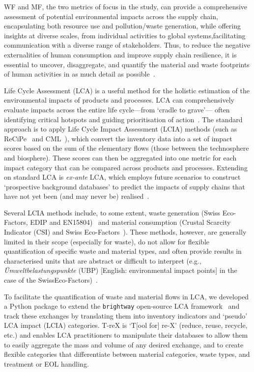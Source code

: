 \documentclass[a4paper,fleqn]{cas-dc}
\begin{document}
WF and MF, the two metrics of focus in the study, can provide a comprehensive assessment of potential environmental impacts across the supply chain, encapsulating both resource use and pollution/waste generation, while offering insights at diverse scales, from individual activities to global  systems,facilitating communication with a diverse range of stakeholders. Thus, to reduce the negative externalities of human consumption and improve supply chain resilience, it is essential to uncover, disaggregate, and quantify the material and waste footprints of human activities in as much detail as  possible~\citep{bisinella2024wastelca,towa2020wastefootprint,berger2020mineralsinlca,sonderegger2020mineralsinlca}.

Life Cycle Assessment (LCA) is a useful method for the holistic estimation of the environmental impacts of products and processes. LCA can comprehensively evaluate impacts across the entire life cycle---from `cradle to grave'--- often identifying critical hotspots and guiding prioritisation of  action~\citep{guinee2011lca}. The standard approach is to apply Life Cycle Impact Assessment (LCIA) methods (such as ReCiPe~\citep{huijbregts2016recipe} and CML~\citep{guinee2002cml}), which convert the inventory data into a set of impact scores based on the sum of the elementary flows (those between the technosphere and biosphere). These scores can then be aggregated into  one metric for each impact  category that can be compared across products and processes. Extending on standard LCA is \textit{ex-ante} LCA, which employs future scenarios to construct `prospective background databases' to predict the impacts of supply chains that have not yet been (and may never be) realised~\citep{cucurachi2018exante,blanco2020exante}.

Several LCIA methods include, to some extent, waste generation (Swiss Eco-Factors, EDIP and EN15804)~\citep{foen2021ecofactors,hauschild2003edip,cen2019en15804} and material consumption (Crustal Scarcity Indicator (CSI) and Swiss Eco-Factors~\citep{arvidsson2020csi,foen2021ecofactors}). These methods, however, are generally limited in their scope (especially for waste), do not allow for flexible quantification of specific waste and material types, and often provide results in characterised units that are abstract or difficult to
interpret (e.g., \textit{Ümweltbelastungspunkte} (UBP) [English: environmental impact points] in the case of the  SwissEco-Factors)~\citep{su2020sustainableproddev}.

To facilitate the quantification of waste and material flows in LCA, we
developed a Python package to extend the \texttt{brightway} open-source LCA
framework~\citep{mutel2017brightway} and track these exchanges by translating
them into inventory indicators and `pseudo' LCA impact (LCIA) categories. T-reX
is `T[ool for] re-X' (reduce, reuse, recycle, etc.) and enables LCA
practitioners to manipulate their databases to allow them to easily aggregate
the mass and volume of any desired exchange, and to create flexible categories
that differentiate between material categories, waste types, and treatment or
EOL handling.
\end{document}

